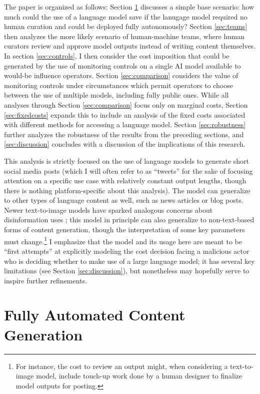 \documentclass{article}
\begin{document}
The paper is organized as follows: Section \ref{sec:automation} discusses a simple base scenario: how much could the use of a language model save if the lanugage model required no human curation and could be deployed fully autonomously? Section \ref{sec:teams} then analyzes the more likely scenario of human-machine teams, where human curators review and approve model outputs instead of writing content themselves. In section \ref{sec:controls}, I then consider the cost imposition that could be generated by the use of monitoring controls on a single AI model available to would-be influence operators. Section \ref{sec:comparison} considers the value of monitoring controls under circumstances which permit operators to choose between the use of multiple models, including fully public ones. While all analyses through Section \ref{sec:comparison} focus only on marginal costs, Section \ref{sec:fixedcosts} expands this to include an analysis of the fixed costs associated with different methods for accessing a language model. Section \ref{sec:robustness} further analyzes the robustness of the results from the preceding sections, and \ref{sec:discussion} concludes with a discussion of the implications of this research. 

This analysis is strictly focused on the use of language models to generate short social media posts (which I will often refer to as ``tweets'' for the sake of focusing attention on a specific use case with relatively constant output lengths, though there is nothing platform-specific about this analysis). The model can generalize to other types of language content as well, such as news articles or blog posts. Newer text-to-image models have sparked analogous concerns about disinformation uses \cite{DRI, wapo}; this model in principle can also generalize to non-text-based forms of content generation, though the interpretation of some key parameters must change.\footnote{For instance, the cost to review an output might, when considering a text-to-image model, include touch-up work done by a human designer to finalize model outputs for posting.} I emphasize that the model and its usage here are meant to be ``first attempts'' at explicitly modeling the cost decision facing a malicious actor who is deciding whether to make use of a large language model; it has several key limitations (see Section \ref{sec:discussion}), but nonetheless may hopefully serve to inspire further refinements. 

\section{Fully Automated Content Generation}
\label{sec:automation}
\end{document}
